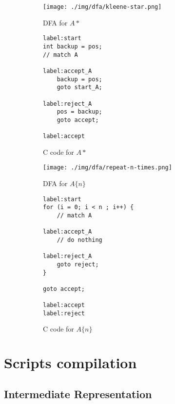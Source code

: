 \documentclass[11pt,a4paper]{report}
\newcommand{\regexp}[1]{$#1$}
\begin{document}
\begin{figure}[h!]
	\begin{subfigure}[h]{0.45\textwidth}
		\centering
		\texttt{[image: ./img/dfa/kleene-star.png]}
		\caption{DFA for \regexp{A*}}
	\end{subfigure}
	\hspace{0.05\textwidth}
	\begin{subfigure}[h]{0.45\textwidth}
		\centering
		\begin{lstlisting}[style=C]
label:start
int backup = pos;
// match A

label:accept_A
	backup = pos;
	goto start_A;

label:reject_A
	pos = backup;
	goto accept;

label:accept
		\end{lstlisting}
		\caption{C code for \regexp{A*}}
	\end{subfigure}
	\caption{}
\end{figure}

\begin{figure}[h!]
	\begin{subfigure}[h]{0.45\textwidth}
		\centering
		\texttt{[image: ./img/dfa/repeat-n-times.png]}
		\caption{DFA for \regexp{A\{n\}}}
	\end{subfigure}
	\hspace{0.05\textwidth}
	\begin{subfigure}[h]{0.45\textwidth}
		\centering
		\begin{lstlisting}[style=C]
label:start
for (i = 0; i < n ; i++) {
	// match A

label:accept_A
	// do nothing

label:reject_A
	goto reject;
}

goto accept;

label:accept
label:reject
		\end{lstlisting}
		\caption{C code for \regexp{A\{n\}}}
	\end{subfigure}
	\caption{}
	\label{dfatoc-ntimes}
\end{figure}

\chapter{Scripts compilation}

\section{Intermediate Representation}
\label{ir}
\end{document}
